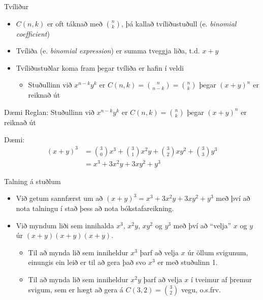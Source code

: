 \documentclass[handout]{beamer}
\begin{document}
\begin{frame}{Tvíliður}
\begin{itemize}
 \item $C(n,k)$ er oft táknað með $\binom{n}{k}$, þá kallað tvíliðustuðull (e. \emph{binomial coefficient})
 \item Tvíliða (e. \emph{binomial expression}) er summa tveggja liða, t.d. $x + y$
 \item Tvíliðustuðlar koma fram þegar tvíliða er hafin í veldi
 \begin{itemize}
  \item Stuðullinn við $x^{n-k}y^{k}$ er $C(n,k) = \binom{n}{n-k} = \binom{n}{k}$ þegar $(x + y)^n$ er reiknað út
 \end{itemize}
\end{itemize}
\end{frame}

\begin{frame}{Dæmi}
Reglan: Stuðullinn við $x^{n-k}y^{k}$ er $C(n,k) = \binom{n}{k}$ þegar $(x + y)^n$ er reiknað út

Dæmi:
\begin{align*}
(x+y)^3 &= \binom{3}{0} x^3 + \binom{3}{1}x^2y + \binom{3}{2}xy^2 + \binom{3}{3}y^3\\
&= x^3 + 3x^2y + 3xy^2 + y^3
\end{align*}

\end{frame}

\begin{frame}{Talning á stuðlum}
\begin{itemize}
 \item Við getum sannfærst um að $(x+y)^3 = x^3 + 3x^2y + 3xy^2 + y^3$ með því að nota talningu í stað þess að nota bókstafareikning.
 \item Við myndum liði sem innihalda $x^3$, $x^2y$, $xy^2$ og $y^3$ með því að ``velja'' $x$ og $y$ úr $(x+y)(x+y)(x+y)$.
 \begin{itemize}
  \item Til að mynda lið sem inniheldur $x^3$ þarf að velja $x$ úr öllum svigunum, einungis ein leið er til að gera það svo $x^3$ er með stuðulinn 1. 
  \item Til að mynda lið sem inniheldur $x^2y$ þarf að velja $x$ í tveimur af þremur svigum, sem er hægt að gera á $C(3,2) = \binom{3}{2}$ vegu, o.s.frv.
 \end{itemize}
\end{itemize}
\end{frame}
\end{document}
